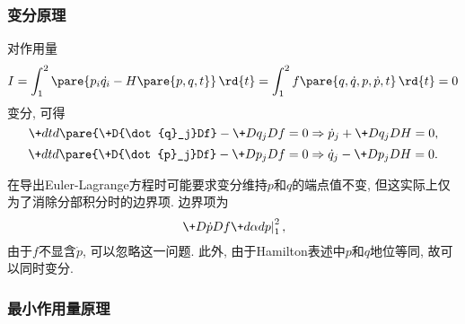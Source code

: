 \documentclass[../TheoreticalMechanics.tex]{subfiles}
\begin{document}
\subsubsection{变分原理} %
\label{ssub:变分原理}

\begin{theorem}[由变分原理导出Hamilton方程]
    对作用量
    \[ I = \int_1^2 \pare{p_i\dot{q_i} - H\pare{p,q,t}}\,\rd{t} = \int_1^2 f\pare{q,\dot{q},p,\dot{p},t}\,\rd{t} = 0 \]
    变分, 可得
    \[ \+dtd{}\pare{\+D{\dot{q}_j}Df} - \+D{q_j}Df = 0 \Rightarrow \dot{p}_j + \+D{q_j}DH = 0, \]
    \[ \+dtd{}\pare{\+D{\dot{p}_j}Df} - \+D{p_j}Df = 0 \Rightarrow \dot{q}_j - \+D{p_j}DH = 0. \]
\end{theorem}
\begin{remark}
    在导出Euler-Lagrange方程时可能要求变分维持$p$和$q$的端点值不变, 但这实际上仅为了消除分部积分时的边界项. 边界项为
    \[ \left.\+D{\dot{p}}Df\+d{\alpha}dp\right\vert_1^2, \]
    由于$f$不显含$\dot{p}$, 可以忽略这一问题. 此外, 由于Hamilton表述中$p$和$q$地位等同, 故可以同时变分.
\end{remark}


\subsubsection{最小作用量原理} %
\label{ssub:最小作用量原理}
\end{document}
